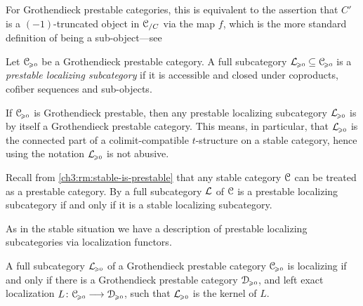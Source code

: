 \begin{remark}
    For Grothendieck prestable categories, this is equivalent to the assertion that $C'$ is a $(-1)$-truncated object in $\EuScript{C}_{/C}$ via the map $f$, which is the more standard definition of being a sub-object---see \cite[C.2.3.4]{lurie_SAG}
\end{remark}

\begin{definition}
    Let $\EuScript{C}_{\hspace{-1pt}\scriptscriptstyle\geqslant 0}$ be a Grothendieck prestable category. A full subcategory $\mathcal{L}_{\hspace{-1pt}\scriptscriptstyle\geqslant 0}\subseteq \EuScript{C}_{\hspace{-1pt}\scriptscriptstyle\geqslant 0}$ is a \emph{prestable localizing subcategory} if it is accessible and closed under coproducts, cofiber sequences and sub-objects. 
\end{definition}

\begin{remark}
    \label{ch3:rm:prestable-localizing-is-Grothendieck}
    If $\EuScript{C}_{\hspace{-1pt}\scriptscriptstyle\geqslant 0}$ is Grothendieck prestable, then any prestable localizing subcategory $\mathcal{L}_{\hspace{-1pt}\scriptscriptstyle\geqslant 0}$ is by \cite[C.5.2.1]{lurie_SAG} itself a Grothendieck prestable category. This means, in particular, that $\mathcal{L}_{\hspace{-1pt}\scriptscriptstyle\geqslant 0}$ is the connected part of a colimit-compatible $t$-structure on a stable category, hence using the notation $\mathcal{L}_{\hspace{-1pt}\scriptscriptstyle\geqslant 0}$ is not abusive. 
\end{remark}

\begin{remark}
    \label{ch3:rm:prestable-localizing-in-stable-then-stable-localizing}
    Recall from \cref{ch3:rm:stable-is-prestable} that any stable category $\EuScript{C}$ can be treated as a prestable category. By \cite[C.2.3.6]{lurie_SAG} a full subcategory $\mathcal{L}$ of $\EuScript{C}$ is a prestable localizing subcategory if and only if it is a stable localizing subcategory. 
\end{remark}

As in the stable situation we have a description of prestable localizing subcategories via localization functors. 

\begin{proposition}
    \label{ch3:prop:Lurie-prestable-localizing-left-exact-functor}
    A full subcategory $\mathcal{L}_{\hspace{-1pt}\scriptscriptstyle\geqslant 0}$ of a Grothendieck prestable category $\EuScript{C}_{\hspace{-1pt}\scriptscriptstyle\geqslant 0}$ is localizing if and only if there is a Grothendieck prestable category $\EuScript{D}_{\hspace{-1pt}\scriptscriptstyle\geqslant 0}$, and left exact localization $L\colon\EuScript{C}_{\hspace{-1pt}\scriptscriptstyle\geqslant 0}\longrightarrow\EuScript{D}_{\hspace{-1pt}\scriptscriptstyle\geqslant 0}$, such that $\mathcal{L}_{\hspace{-1pt}\scriptscriptstyle\geqslant 0}$ is the kernel of $L$. 
\end{proposition}















